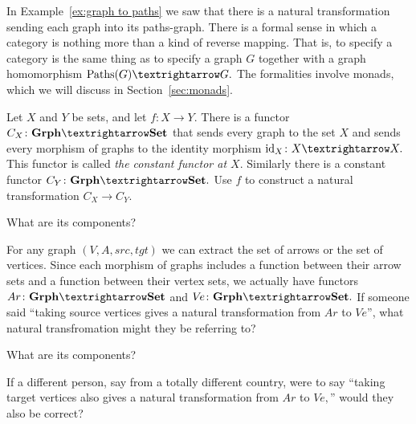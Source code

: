 \documentclass[../main/CT4S-EN-RU]{subfiles}
\begin{document}
\begin{exampleRUS}\label{ex:concat paths of paths}
\end{exampleRUS}

\begin{remarkENG}
In Example~\ref{ex:graph to paths} we saw that there is a natural transformation sending each graph into its paths-graph. There is a formal sense in which a category is nothing more than a kind of reverse mapping. That is, to specify a category is the same thing as to specify a graph $G$ together with a graph homomorphism $\Paths(G){→} G.$ The formalities involve monads, which we will discuss in Section~\ref{sec:monads}.
\end{remarkENG}

\begin{remarkRUS}
\end{remarkRUS}

\begin{exerciseENG}
Let $X$ and $Y$ be sets, and let $f\colon X{→} Y.$ There is a functor $C_X\colon\Grph{→}\Set$ that sends every graph to the set $X$ and sends every morphism of graphs to the identity morphism $\id_X\colon X{→} X.$ This functor is called {\em the constant functor at $X$}. Similarly there is a constant functor $C_Y\colon\Grph{→}\Set.$
\sexc Use $f$ to construct a natural transformation $C_X{→} C_Y.$
\item What are its components?
\endsexc
\end{exerciseENG}

\begin{exerciseRUS}
\end{exerciseRUS}

\begin{exerciseENG}
For any graph $(V,A,src,tgt)$ we can extract the set of arrows or the set of vertices. Since each morphism of graphs includes a function between their arrow sets and a function between their vertex sets, we actually have functors $Ar\colon\Grph{→}\Set$ and $V\!e\colon\Grph{→}\Set.$
\sexc If someone said “taking source vertices gives a natural transformation from $Ar$ to $V\!e$”, what natural transfromation might they be referring to?
\item What are its components? 
\item If a different person, say from a totally different country, were to say “taking target vertices also gives a natural transformation from $Ar$ to $V\!e,$” would they also be correct?
\endsexc
\end{exerciseENG}
\end{document}
